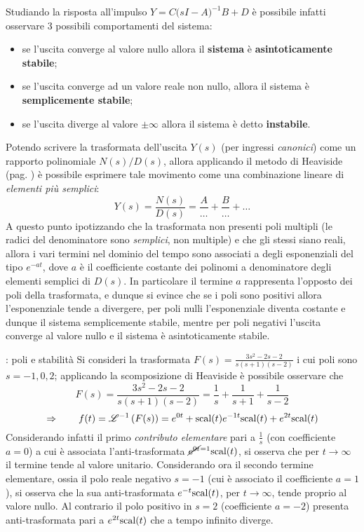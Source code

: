 	Studiando la risposta all'impulso $Y= C\big(sI-A\big)^{-1} B + D$ è possibile infatti osservare 3 possibili comportamenti del sistema:
	\begin{itemize}
		\item se l'uscita converge al valore nullo allora il \textbf{sistema} è \textbf{asintoticamente stabile};
		\item se l'uscita converge ad un valore reale non nullo, allora il sistema è \textbf{semplicemente stabile};
		\item se l'uscita diverge al valore $\pm \infty$ allora il sistema è detto \textbf{instabile}.
	\end{itemize}	
	
	Potendo scrivere la trasformata dell'uscita $Y(s)$ (per ingressi \textit{canonici}) come un rapporto polinomiale $N(s)/D(s)$, allora applicando il metodo di Heaviside (pag. \pageref{sec:class:heaviside}) è possibile esprimere tale movimento come una combinazione lineare di \textit{elementi più semplici}:
	\[ Y(s) = \frac{N(s)}{D(s)} = \frac A \dots + \frac B \dots + \dots \]
	A questo punto ipotizzando che la trasformata non presenti poli multipli (le radici del denominatore sono \textit{semplici}, non multiple)  e che gli stessi siano reali, allora i vari termini nel dominio del tempo sono associati a degli esponenziali del tipo $e^{-at}$, dove $a$ è il coefficiente costante dei polinomi a denominatore degli elementi semplici di $D(s)$. In particolare il termine $a$ rappresenta l'opposto dei poli della trasformata, e dunque si evince che se i poli sono positivi allora l'esponenziale tende a divergere, per poli nulli l'esponenziale diventa costante e dunque il sistema semplicemente stabile, mentre per poli negativi l'uscita converge al valore nullo e il sistema è asintoticamente stabile.
	\begin{esempio}{: poli e stabilità}
		Si consideri la trasformata $F(s)= \frac{3s^2 - 2 s - 2}{s(s+1)(s-2)} $ i cui poli sono $s=-1,0,2$; applicando la scomposizione di Heaviside è possibile osservare che
		\[ F(s) = \frac{3s^2 - 2 s - 2}{s(s+1)(s-2)}  = \frac 1 s+ \frac 1 {s+1} + \frac  1{s - 2}\]
		\[ \Rightarrow \qquad f(t) = \mathscr {L}^{-1} \left( F(s) \right) = e^{0t} + \textrm{scal} (t) e^{-1t} \textrm{scal}(t) + e^{2t}\textrm{scal}(t) \]
		Considerando infatti il primo \textit{contributo elementare} pari a $\frac 1 s$ (con coefficiente $a = 0$) a cui è associata l'anti-trasformata $\cancel{e^{0t}} ^{=1} \textrm{scal}(t)$, si osserva che per $t\rightarrow\infty$ il termine tende al valore unitario. Considerando ora il secondo termine elementare, ossia il polo reale negativo $s=-1$ (cui è associato il coefficiente $a= 1$), si osserva che la sua anti-trasformata $e^{-t}\textrm{scal}(t)$, per $t\rightarrow \infty$, tende proprio al valore nullo. Al contrario il polo positivo in $s =2$ (coefficiente $a= -2$) presenta anti-trasformata pari a $e^{2t}\textrm{scal}(t)$ che a tempo infinito diverge.		
	\end{esempio}
	
